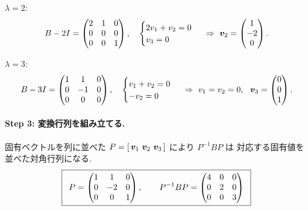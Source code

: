 \documentclass[11pt,a4paper]{article}
\begin{document}
\noindent$\lambda=2$:
\[
B-2I=\begin{pmatrix}2&1&0\\0&0&0\\0&0&1\end{pmatrix},\quad
\begin{cases}2v_1+v_2=0\\ v_3=0\end{cases}
\ \Rightarrow\ \bm{v}_2=\begin{pmatrix}1\\-2\\0\end{pmatrix}.
\]

\noindent$\lambda=3$:
\[
B-3I=\begin{pmatrix}1&1&0\\0&-1&0\\0&0&0\end{pmatrix},\quad
\begin{cases}v_1+v_2=0\\ -v_2=0\end{cases}
\ \Rightarrow\ v_1=v_2=0,\ \ \vv_3=\begin{pmatrix}0\\0\\1\end{pmatrix}.
\]

\paragraph{Step 3: 変換行列を組み立てる.}
固有ベクトルを列に並べた $P=[\,\vv_1\ \vv_2\ \vv_3\,]$ により $P^{-1}BP$ は
対応する固有値を並べた対角行列になる.
\[
\ans{\
P=\begin{pmatrix}1&1&0\\0&-2&0\\0&0&1\end{pmatrix},\qquad
P^{-1}BP=\begin{pmatrix}4&0&0\\0&2&0\\0&0&3\end{pmatrix}\ }
\]
\end{document}
